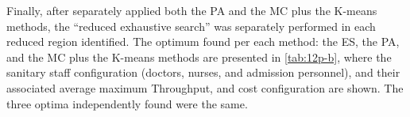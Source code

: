 Finally, after separately applied both the PA and the MC plus the
K-means methods, the \textquotedblleft{}reduced exhaustive search\textquotedblright{}
was separately performed in each reduced region identified. The optimum
found per each method: the ES, the PA, and the MC plus the K-means
methods are presented in \ref{tab:12p-b}, where the sanitary staff
configuration (doctors, nurses, and admission personnel), and their
associated average maximum Throughput, and cost configuration are
shown. The three optima independently found were the same.


